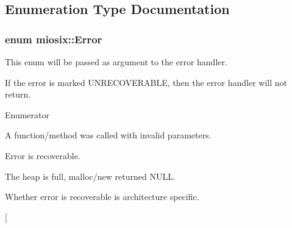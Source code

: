 \subsection{Enumeration Type Documentation}
\hypertarget{namespacemiosix_ac0146189e7df18439dc2f4103f07cfe8}{
\subsubsection[{Error}]{\setlength{\rightskip}{0pt plus 5cm}enum {\bf miosix\-::\-Error}}}\label{namespacemiosix_ac0146189e7df18439dc2f4103f07cfe8}
This enum will be passed as argument to the error handler.\par
 If the error is marked U\-N\-R\-E\-C\-O\-V\-E\-R\-A\-B\-L\-E, then the error handler will not return. \begin{Desc}
\item[Enumerator]\par
\begin{description}
\item[{\em 
\hypertarget{namespacemiosix_ac0146189e7df18439dc2f4103f07cfe8af0fb70dd25fac18136ea28f9c0286b65}{I\-N\-V\-A\-L\-I\-D\-\_\-\-P\-A\-R\-A\-M\-E\-T\-E\-R\-S}\label{namespacemiosix_ac0146189e7df18439dc2f4103f07cfe8af0fb70dd25fac18136ea28f9c0286b65}
}]A function/method was called with invalid parameters.\par
 Error is recoverable. \item[{\em 
\hypertarget{namespacemiosix_ac0146189e7df18439dc2f4103f07cfe8a4a9ecbff543a923809f4a669f5a2ff18}{O\-U\-T\-\_\-\-O\-F\-\_\-\-M\-E\-M\-O\-R\-Y}\label{namespacemiosix_ac0146189e7df18439dc2f4103f07cfe8a4a9ecbff543a923809f4a669f5a2ff18}
}]The heap is full, malloc/new returned N\-U\-L\-L.\par
 Whether error is recoverable is architecture specific. \item[{\em 
}
\end{description}
\end{Desc}
